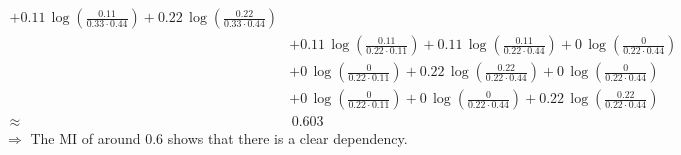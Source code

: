 {\begin{align*}
   	+ 0.11\, \log\left(\frac{0.11}{0.33 \cdot 0.44} \right) 
   	+ 0.22\, \log\left(\frac{0.22}{0.33 \cdot 0.44} \right) \\
   	& + 0.11\, \log\left(\frac{0.11}{0.22 \cdot 0.11} \right)
   	+ 0.11\, \log\left(\frac{0.11}{0.22 \cdot 0.44} \right) 
   	+ 0\, \log\left(\frac{0}{0.22 \cdot 0.44} \right) \\
   	& + 0\, \log\left(\frac{0}{0.22 \cdot 0.11} \right)
   	+ 0.22\, \log\left(\frac{0.22}{0.22 \cdot 0.44} \right) 
   	+ 0\, \log\left(\frac{0}{0.22 \cdot 0.44} \right) \\
   	& + 0\, \log\left(\frac{0}{0.22 \cdot 0.11} \right)
   	+ 0\, \log\left(\frac{0}{0.22 \cdot 0.44} \right) 
   	+ 0.22\, \log\left(\frac{0.22}{0.22 \cdot 0.44} \right) \\
   	\approx & \, 0.603
   \end{align*}
$\Rightarrow$
The MI of around 0.6 shows that there is a clear dependency.

}
